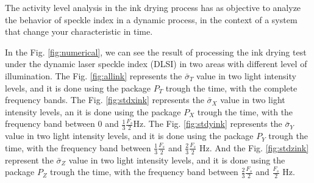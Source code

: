 \documentclass[review]{elsarticle}
\begin{document}
The activity level analysis in the ink drying process has as objective to analyze the behavior of speckle index in a  dynamic process,
in the context of a system that change your characteristic in time. 

In the Fig. \ref{fig:numerical}, we can see the result of processing 
 the ink drying test under the dynamic laser speckle index (DLSI) in two areas with different level of illumination. The Fig. \ref{fig:allink}
represents the $\bar{\sigma}_T$ value in two light intensity levels, and it is done using the package $P_T$
trough the time, with the complete frequency bands.
The Fig. \ref{fig:stdxink}
represents the $\bar{\sigma}_X$ value in two light intensity levels, an it is done using the package $P_X$
trough the time, with the frequency band between $0$ and $\frac{1}{3}\frac{F_s}{2}$Hz.
The Fig. \ref{fig:stdyink}
represents the $\bar{\sigma}_Y$ value in two light intensity levels, and it is done using the package $P_Y$
trough the time, with the frequency band between $\frac{1}{3}\frac{F_s}{2}$ and $\frac{2}{3}\frac{F_s}{2}$ Hz.
And the Fig. \ref{fig:stdzink}
represent the $\bar{\sigma}_Z$ value in two light intensity levels, and it is done using the package $P_Z$
trough the time, with the frequency band between $\frac{2}{3}\frac{F_s}{2}$ and $\frac{F_s}{2}$ Hz.
\end{document}
